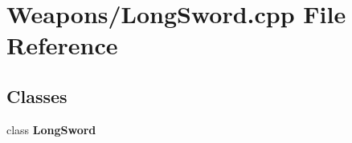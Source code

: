 \section{Weapons/\-Long\-Sword.cpp File Reference}
\label{_long_sword_8cpp}
\subsection*{Classes}
\begin{DoxyCompactItemize}
\item 
class {\bf Long\-Sword}
\end{DoxyCompactItemize}
